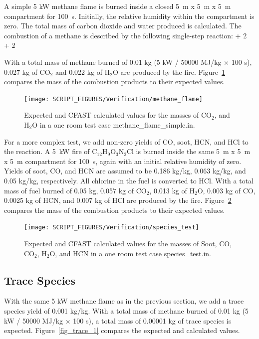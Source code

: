 A simple 5 kW methane flame is burned inside a closed 5~m x 5~m x 5~m compartment for 100~s. Initially, the relative humidity within the compartment is zero. The total mass of carbon dioxide and water produced is calculated. The combustion of a methane is described by the following single-step reaction:
\be
    +  2 \,   \rightarrow  {} + 2 \, 
\ee

With a total mass of methane burned of 0.01 kg (5 kW / 50000 MJ/kg $\times$ 100 s), 0.027 kg of CO$_2$ and 0.022 kg of H$_2$O are produced by the fire. Figure~\ref{fig_methane_flame_yields} compares the mass of the combustion products to their expected values.

\begin{figure}[ht]
\centering
\texttt{[image: SCRIPT\_FIGURES/Verification/methane\_flame]}
\caption[Results of the test case {\ct methane\_flame\_simple.in}]{Expected and CFAST calculated values for the masses of CO$_2$, and H$_2$O in a one room test case {\ct methane\_flame\_simple.in}.}
\label{fig_methane_flame_yields}
\end{figure}

For a more complex test, we add non-zero yields of CO, soot, HCN, and HCl to the reaction. A 5~kW fire of C$_{12}$H$_9$O$_3$N$_2$Cl is burned inside the same 5~m x 5~m x 5~m compartment for 100~s, again with an initial relative humidity of zero.  Yields of soot, CO, and HCN are assumed to be 0.186 kg/kg, 0.063 kg/kg, and 0.05 kg/kg, respectively. All chlorine in the fuel is converted to HCl. With a total mass of fuel burned of 0.05 kg, 0.057 kg of CO$_2$, 0.013 kg of H$_2$O, 0.003 kg of CO, 0.0025 kg of HCN, and 0.007 kg of HCl are produced by the fire. Figure~\ref{fig_species_test_yields} compares the mass of the combustion products to their expected values.

\begin{figure}[ht]
\centering
\texttt{[image: SCRIPT\_FIGURES/Verification/species\_test]}
\caption[Results of the test case {\ct species\_test.in}]{Expected and CFAST calculated values for the masses of Soot, CO, CO$_2$, H$_2$O, and HCN in a one room test case {\ct species\_test.in}.}
\label{fig_species_test_yields}
\end{figure}

\subsection{Trace Species}

With the same 5 kW methane flame as in the previous section, we add a trace species yield of 0.001 kg/kg. With a total mass of methane burned of 0.01 kg (5 kW / 50000 MJ/kg $\times$ 100 s), a total mass of 0.00001 kg of trace species is expected. Figure~\ref{fig_trace_1} compares the expected and calculated values.

